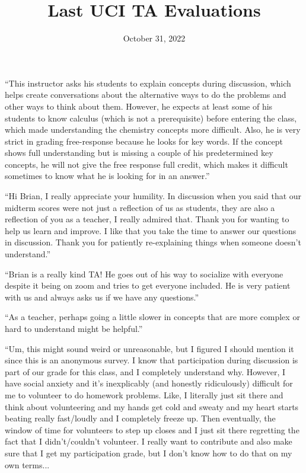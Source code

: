 \documentclass[11pt]{beamer}
\title{Last UCI TA Evaluations}
\institute{Chemistry Department, Cypress College}
\date{October 31, 2022}
\begin{document}
\begin{frame}
  \titlepage
\end{frame}

\begin{frame}
  ``This instructor asks his students to explain concepts during discussion, which helps
  create conversations about the alternative ways to do the problems and other ways to
  think about them. However, he expects at least some of his students to know calculus
  (which is not a prerequisite) before entering the class, which made understanding
  the chemistry concepts more difficult. Also, he is very strict in grading free-response
  because he looks for key words. If the concept shows full understanding but is missing
  a couple of his predetermined key concepts, he will not give the free response full
  credit, which makes it difficult sometimes to know what he is looking for in an answer.''
\end{frame}

\begin{frame}
  ``Hi Brian, I really appreciate your humility. In discussion when you said that our
  midterm scores were not just a reﬂection of us as students, they are also a reflection
  of you as a teacher, I really admired that. Thank you for wanting to help us learn and
  improve. I like that you take the time to answer our questions in discussion. Thank
  you for patiently re-explaining things when someone doesn't understand.''
\end{frame}

\begin{frame}
  ``Brian is a really kind TA! He goes out of his way to socialize with everyone despite
  it being on zoom and tries to get everyone included. He is very patient with us and
  always asks us if we have any questions.''
\end{frame}

\begin{frame}
  ``As a teacher, perhaps going a little slower in concepts that are more complex or hard
  to understand might be helpful.''
\end{frame}

\begin{frame}
  ``Um, this might sound weird or unreasonable, but I ﬁgured I should mention it since
  this is an anonymous survey. I know that participation during discussion is part of our
  grade for this class, and I completely understand why. However, I have social anxiety and
  it's inexplicably (and honestly ridiculously) difficult for me to volunteer to do
  homework problems. Like, I literally just sit there and think about volunteering and
  my hands get cold and sweaty and my heart starts beating really fast/loudly and I completely
  freeze up. Then eventually, the window of time for volunteers to step up closes
  and I just sit there regretting the fact that I didn't/couldn't volunteer. I really want to
  contribute and also make sure that I get my participation grade, but I don't know how
  to do that on my own terms...
\end{frame}
\end{document}
